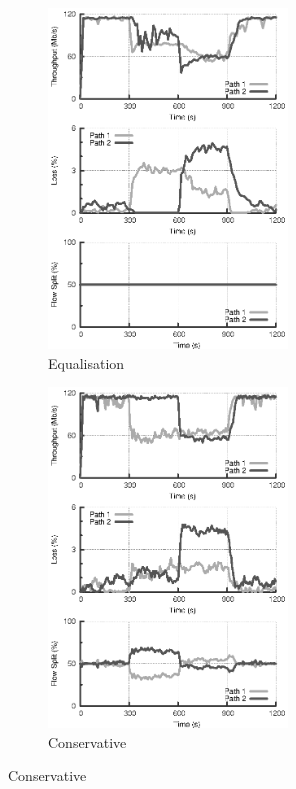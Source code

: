 \begin{figure}
    \begin{subfigure}[b]{.5\linewidth}
        \centering
        \includegraphics[width=2.5in]{figures/cate/two/equal}
        \caption{Equalisation}\label{fig:twoequal}
    \end{subfigure}%
    \begin{subfigure}[b]{.5\linewidth}
        \centering
        \includegraphics[width=2.5in]{figures/cate/two/cons}
        \caption{Conservative}\label{fig:twocons}
    \end{subfigure}%

    \vspace{10mm}


\end{figure}
